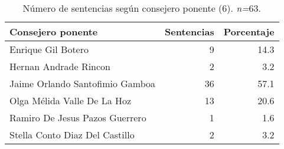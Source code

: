 \begin{table}[!htbp]
\centering
\caption{Número de sentencias según consejero ponente (6). \textit{n=}63.} 
\label{tab:consejero}
\begin{tabular}{lrr}
  \hline
Consejero ponente & Sentencias & Porcentaje \\ 
  \hline
Enrique Gil Botero &  9 & 14.3 \\ 
  Hernan Andrade Rincon &  2 & 3.2 \\ 
  Jaime Orlando Santofimio Gamboa & 36 & 57.1 \\ 
  Olga Mélida Valle De La Hoz & 13 & 20.6 \\ 
  Ramiro De Jesus Pazos Guerrero &  1 & 1.6 \\ 
  Stella Conto Diaz Del Castillo &  2 & 3.2 \\ 
   \hline
\end{tabular}
\end{table}

